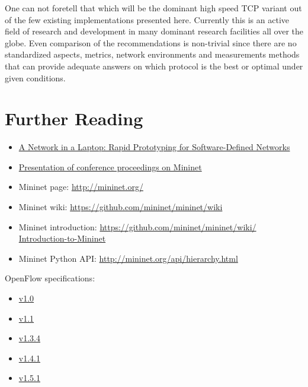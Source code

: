 \documentclass[a4paper]{article}
\begin{document}
One can not foretell that which will be the dominant high speed TCP variant out of the few existing implementations presented here. Currently this is an active field of research and development in many dominant research facilities all over the globe. Even comparison of the recommendations is non-trivial since there are no standardized aspects, metrics, network environments and measurements methods that can provide adequate answers on which protocol is the best or optimal under given conditions.




\section{Further Reading}

\begin{itemize}
    \item \href{https://qosip.tmit.bme.hu/foswiki/pub/Meres/OpenFlowMScMeresiSegedlet/a19-lantz.pdf}{A Network in a
              Laptop: Rapid Prototyping for Software-Defined Networks}
    \item

          \href{https://qosip.tmit.bme.hu/foswiki/pub/Meres/OpenFlowMScMeresiSegedlet/mininet-hotnets2010-final.pdf}{Presentation
              of conference proceedings on Mininet}
    \item	Mininet page: \url{http://mininet.org/}
    \item	Mininet wiki: \url{https://github.com/mininet/mininet/wiki}
    \item	Mininet introduction: \url{https://github.com/mininet/mininet/wiki/  Introduction-to-Mininet}
    \item	Mininet Python API: \url{http://mininet.org/api/hierarchy.html}
\end{itemize}

OpenFlow specifications:
\begin{itemize}
    \item
          \href{https://qosip.tmit.bme.hu/foswiki/pub/Meres/OpenFlowMScMeresiSegedlet/openflow-spec-v1.0.0.pdf}{v1.0}
    \item
          \href{https://qosip.tmit.bme.hu/foswiki/pub/Meres/OpenFlowMScMeresiSegedlet/openflow-spec-v1.1.0.pdf}{v1.1}
    \item

          \href{https://qosip.tmit.bme.hu/foswiki/pub/Meres/OpenFlowMScMeresiSegedlet/openflow-switch-v1.3.4.pdf}{v1.3.4}
    \item

          \href{https://qosip.tmit.bme.hu/foswiki/pub/Meres/OpenFlowMScMeresiSegedlet/openflow-switch-v1.4.1.pdf}{v1.4.1}
    \item

          \href{https://qosip.tmit.bme.hu/foswiki/pub/Meres/OpenFlowMScMeresiSegedlet/openflow-switch-v1.5.1.pdf}{v1.5.1}

\end{itemize}
\end{document}
